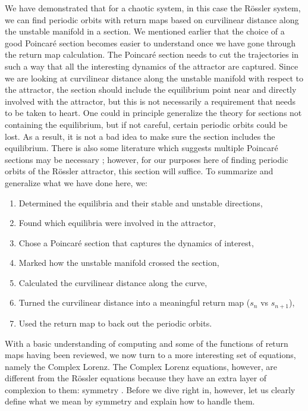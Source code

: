 \documentclass[12 pt]{article}
\begin{document}
We have demonstrated that for a chaotic system, in this case the R\"ossler system, we can find periodic orbits with return maps based on curvilinear distance along the unstable manifold in a section. We mentioned earlier that the choice of a good Poincar\'e section becomes easier to understand once we have gone through the return map calculation.  The Poincar\'e section needs to cut the trajectories in such a way that all the interesting dynamics of the attractor are captured.  Since we are looking at curvilinear distance along the unstable manifold with respect to the attractor, the section should include the equilibrium point near and directly involved with the attractor, but this is not necessarily a requirement that needs to be taken to heart.  One could in principle generalize the theory for sections not containing the equilibrium, but if not careful, certain periodic orbits could be lost.  As a result, it is not a bad idea to make sure the section includes the equilibrium.  There is also some literature which suggests multiple Poincar\'e sections may be necessary \cite{Atl}; however, for our purposes here of finding periodic orbits of the R\"ossler attractor, this section will suffice.
To summarize and generalize what we have done here, we:
\begin{enumerate}
    \item Determined the equilibria and their stable and unstable directions,
    \item Found which equilibria were involved in the attractor,
    \item Chose a Poincar\'e section that captures the dynamics of interest,
    \item Marked how the unstable manifold crossed the section,
    \item Calculated the curvilinear distance along the curve,
    \item Turned the curvilinear distance into a meaningful return map ($s_{n}$ vs $s_{n+1}$),
    \item Used the return map to back out the periodic orbits.
\end{enumerate}

With a basic understanding of computing and some of the functions of return maps having been reviewed, we now turn to a more interesting set of equations, namely the Complex Lorenz.  The Complex Lorenz equations, however, are different from the R\"ossler equations because they have an extra layer of complexion to them: symmetry \cite{Eth}.  Before we dive right in, however, let us clearly define what we mean by symmetry and explain how to handle them.
\end{document}
